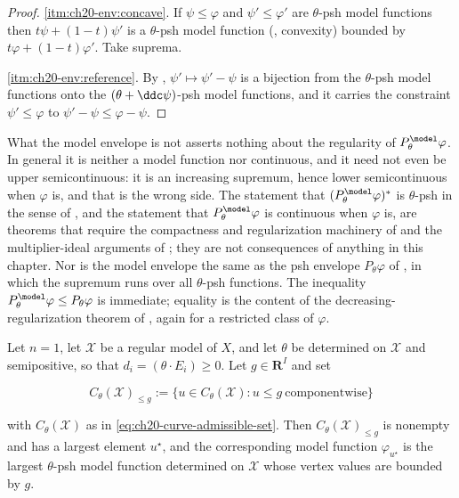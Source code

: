 \begin{proof}
\cref{itm:ch20-env:concave}.  If \(\psi\leq\varphi\) and
\(\psi'\leq\varphi'\) are \(\theta\)-psh model functions then
\(t\psi+(1-t)\psi'\) is a \(\theta\)-psh model function
(, convexity) bounded by
\(t\varphi+(1-t)\varphi'\).  Take suprema.

\cref{itm:ch20-env:reference}.  By ,
\(\psi'\mapsto\psi'-\psi\) is a bijection from the \(\theta\)-psh model
functions onto the \((\theta+\ddc\psi)\)-psh model functions, and it carries
the constraint \(\psi'\leq\varphi\) to \(\psi'-\psi\leq\varphi-\psi\).
\end{proof}

\begin{warning}{What the model envelope is not}
 asserts nothing about the regularity of
\(P^{\model}_\theta\varphi\).  In general it is neither a model function nor
continuous, and it need not even be upper semicontinuous: it is an
increasing supremum, hence lower semicontinuous when \(\varphi\) is, and
that is the wrong side.  The statement that
\((P^{\model}_\theta\varphi)^*\) is \(\theta\)-psh in the sense of
, and the statement that
\(P^{\model}_\theta\varphi\) is continuous when \(\varphi\) is, are theorems
that require the compactness and regularization machinery of
 and the multiplier-ideal arguments of
; they are not consequences of anything in this
chapter.  Nor is the model envelope the same as the psh envelope
\(P_\theta\varphi\) of , in which the supremum runs
over all \(\theta\)-psh functions.  The inequality
\(P^{\model}_\theta\varphi\leq P_\theta\varphi\) is immediate; equality is
the content of the decreasing-regularization theorem of
, again for a restricted class of \(\varphi\).
\end{warning}

\begin{proposition}
\label{prop:ch20-curve-envelope}
Let \(n=1\), let \(\mathcal X\) be a regular model of \(X\), and let
\(\theta\) be determined on \(\mathcal X\) and semipositive, so that
\(d_i=(\theta\cdot E_i)\geq0\).  Let \(g\in\mathbf R^I\) and set

\[
 C_\theta(\mathcal X)_{\le g}
 :=\{u\in C_\theta(\mathcal X):u\leq g\ \text{componentwise}\}
\]

with \(C_\theta(\mathcal X)\) as in
\eqref{eq:ch20-curve-admissible-set}.  Then
\(C_\theta(\mathcal X)_{\le g}\) is nonempty and has a largest element
\(u^\star\), and the corresponding model function
\(\varphi_{u^\star}\) is the largest \(\theta\)-psh model function
determined on \(\mathcal X\) whose vertex values are bounded by \(g\).
\end{proposition}

